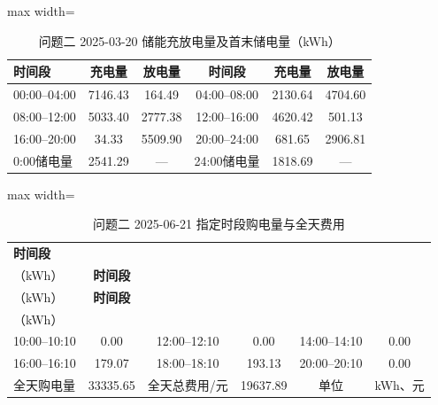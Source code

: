 \documentclass[UTF8,a4paper,zihao=-4,fontset=windows]{ctexart}
\begin{document}
\begin{table}[H]\centering
\fontsize{9.5}{12}\selectfont\setlength{\tabcolsep}{4pt}\renewcommand{\arraystretch}{1.12}
\begin{adjustbox}{max width=\linewidth}\begin{tabular}{lccccc}\toprule
\textbf{时间段} & \textbf{充电量} & \textbf{放电量} & \textbf{时间段} & \textbf{充电量} & \textbf{放电量}\\\midrule
00:00–04:00 & 7146.43 & 164.49 & 04:00–08:00 & 2130.64 & 4704.60\\
08:00–12:00 & 5033.40 & 2777.38 & 12:00–16:00 & 4620.42 & 501.13\\
16:00–20:00 & 34.33 & 5509.90 & 20:00–24:00 & 681.65 & 2906.81\\
0:00储电量 & 2541.29 & — & 24:00储电量 & 1818.69 & —\\
\bottomrule\end{tabular}\end{adjustbox}
\caption{问题二 2025-03-20 储能充放电量及首末储电量（kWh）}
\end{table}
\begin{table}[H]\centering
\fontsize{9.5}{12}\selectfont\setlength{\tabcolsep}{4pt}\renewcommand{\arraystretch}{1.12}
\begin{adjustbox}{max width=\linewidth}\begin{tabular}{lccccc}\toprule
\textbf{时间段} & \shortstack{\textbf{购电量}\\{\normalfont （kWh）}} & \textbf{时间段} & \shortstack{\textbf{购电量}\\{\normalfont （kWh）}} & \textbf{时间段} & \shortstack{\textbf{购电量}\\{\normalfont （kWh）}}\\\midrule
10:00–10:10 & 0.00 & 12:00–12:10 & 0.00 & 14:00–14:10 & 0.00\\
16:00–16:10 & 179.07 & 18:00–18:10 & 193.13 & 20:00–20:10 & 0.00\\
全天购电量 & 33335.65 & 全天总费用/元 & 19637.89 & 单位 & kWh、元\\
\bottomrule\end{tabular}\end{adjustbox}
\caption{问题二 2025-06-21 指定时段购电量与全天费用}
\end{table}
\end{document}
